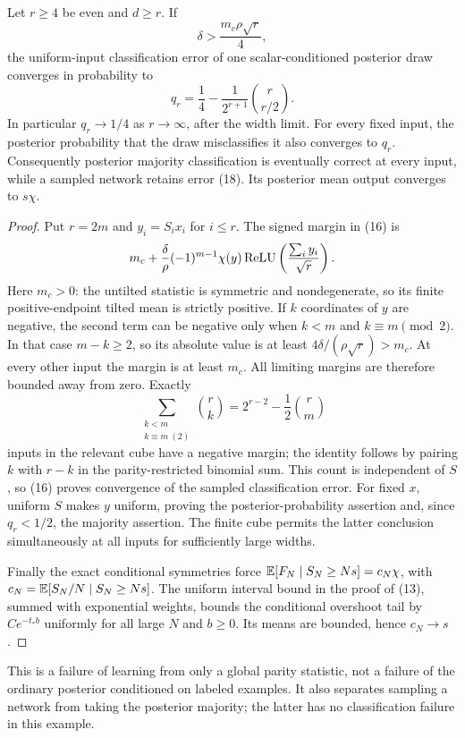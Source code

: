 \begin{corollary}
Let $r\ge4$ be even and $d\ge r$. If
\[
                 \delta>\frac{m_c\rho\sqrt r}{4},       \tag{17}
\]
the uniform-input classification error of one scalar-conditioned
posterior draw converges in probability to
\[
 q_r=\frac14-\frac1{2^{r+1}}\binom r{r/2}.
 \tag{18}
\]
In particular $q_r\to1/4$ as $r\to\infty$, after the width limit.
For every fixed input, the posterior probability that the draw
misclassifies it also converges to $q_r$. Consequently posterior
majority classification is eventually correct at every input, while a
sampled network retains error (18). Its posterior mean output converges
to $s\chi$.
\end{corollary}
\begin{proof}
Put $r=2m$ and $y_i=S_ix_i$ for $i\le r$. The signed margin in (16)
is
\[
 m_c+\frac\delta\rho(-1)^{m-1}\chi(y)
             \operatorname{ReLU}\left(\frac{\sum_i y_i}{\sqrt r}\right).
\]
Here $m_c>0$: the untilted statistic is symmetric and nondegenerate,
so its finite positive-endpoint tilted mean is strictly positive.
If $k$ coordinates of $y$ are negative, the second term can be negative
only when $k<m$ and $k\equiv m\pmod2$. In that case $m-k\ge2$,
so its absolute value is at least $4\delta/(\rho\sqrt r)>m_c$.
At every other input the margin is at least $m_c$. All limiting margins
are therefore bounded away from zero. Exactly
\[
 \sum_{\substack{k<m\\k\equiv m\ (2)}}\binom r k
       =2^{r-2}-\frac12\binom r m
\]
inputs in the relevant cube have a negative margin; the identity follows
by pairing $k$ with $r-k$ in the parity-restricted binomial sum.
This count is independent of $S$, so (16) proves convergence of the
sampled classification error. For fixed $x$, uniform $S$ makes $y$
uniform, proving the posterior-probability assertion and, since
$q_r<1/2$, the majority assertion. The finite cube permits the latter
conclusion simultaneously at all inputs for sufficiently large widths.

Finally the exact conditional symmetries force
$\mathbb E[F_N\mid S_N\ge Ns]=c_N\chi$, with
$c_N=\mathbb E[S_N/N\mid S_N\ge Ns]$.
The uniform interval bound in the proof of (13), summed with exponential
weights, bounds the conditional overshoot tail by $C e^{-t_*b}$
uniformly for all large $N$ and $b\ge0$. Its means are bounded, hence
$c_N\to s$.
\end{proof}

This is a failure of learning from only a global parity statistic, not
a failure of the ordinary posterior conditioned on labeled examples.
It also separates sampling a network from taking the posterior majority;
the latter has no classification failure in this example.
